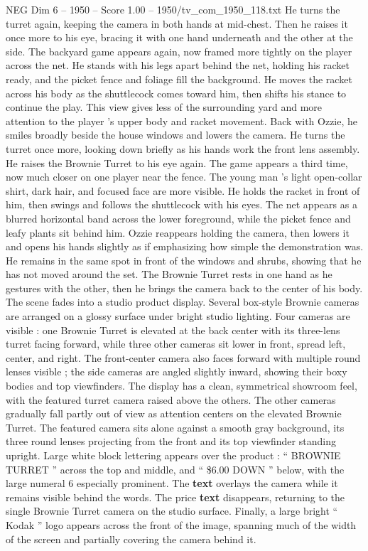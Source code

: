 \begin{textsample}{NEG Dim 6 – 1950 – Score 1.00 – 1950/tv\_com\_1950\_118.txt}
He turns the turret again, keeping the camera in both hands at mid-chest.
Then he raises it once more to his eye, bracing it with one hand underneath and the other at the side.
The backyard game appears again, now framed more tightly on the player across the net.
He stands with his legs apart behind the net, holding his racket ready, and the picket fence and foliage fill the background.
He moves the racket across his body as the shuttlecock comes toward him, then shifts his stance to continue the play.
This view gives less of the surrounding yard and more attention to the player ’s upper body and racket movement.
Back with Ozzie, he smiles broadly beside the house windows and lowers the camera.
He turns the turret once more, looking down briefly as his hands work the front lens assembly.
He raises the Brownie Turret to his eye again.
The game appears a third time, now much closer on one player near the fence.
The young man ’s light open-collar shirt, dark hair, and focused face are more visible.
He holds the racket in front of him, then swings and follows the shuttlecock with his eyes.
The net appears as a blurred horizontal band across the lower foreground, while the picket fence and leafy plants sit behind him.
Ozzie reappears holding the camera, then lowers it and opens his hands slightly as if emphasizing how simple the demonstration was.
He remains in the same spot in front of the windows and shrubs, showing that he has not moved around the set.
The Brownie Turret rests in one hand as he gestures with the other, then he brings the camera back to the center of his body.
The scene fades into a studio product display.
Several box-style Brownie cameras are arranged on a glossy surface under bright studio lighting.
Four cameras are visible : one Brownie Turret is elevated at the back center with its three-lens turret facing forward, while three other cameras sit lower in front, spread left, center, and right.
The front-center camera also faces forward with multiple round lenses visible ; the side cameras are angled slightly inward, showing their boxy bodies and top viewfinders.
The display has a clean, symmetrical showroom feel, with the featured turret camera raised above the others.
The other cameras gradually fall partly out of view as attention centers on the elevated Brownie Turret.
The featured camera sits alone against a smooth gray background, its three round lenses projecting from the front and its top viewfinder standing upright.
Large white block lettering appears over the product : “ BROWNIE TURRET ” across the top and middle, and “ \$6.00 DOWN ” below, with the large numeral 6 especially prominent.
The \textbf{text} overlays the camera while it remains visible behind the words.
The price \textbf{text} disappears, returning to the single Brownie Turret camera on the studio surface.
Finally, a large bright “ Kodak ” logo appears across the front of the image, spanning much of the width of the screen and partially covering the camera behind it.

\end{textsample}
